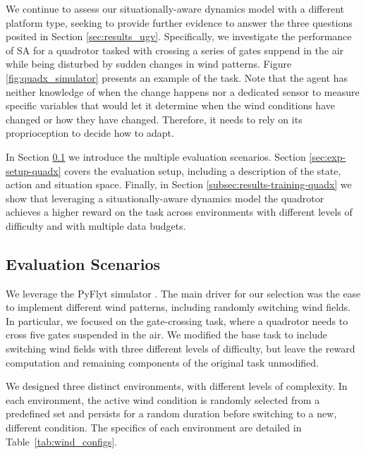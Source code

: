 \documentclass[Afour,sageh,times]{sagej}
\theoremstyle{lemma}
\begin{document}
We continue to assess our situationally-aware dynamics model with a different platform type, seeking to provide further evidence to answer the three questions posited in Section \ref{sec:results_ugv}. Specifically, we investigate the performance of SA for a quadrotor tasked with crossing a series of gates suppend in the air while being disturbed by sudden changes in wind patterns. Figure \ref{fig:quadx_simulator} presents an example of the task. Note that the agent has neither knowledge of when the change happens nor a dedicated sensor to measure specific variables that would let it determine when the wind conditions have changed or how they have changed. Therefore, it needs to rely on its proprioception to decide how to adapt.

In Section \ref{subsec:eval-scenarios-quadx} we introduce the multiple evaluation scenarios. Section \ref{sec:exp-setup-quadx} covers the evaluation setup, including a description of the state, action and situation space. Finally, in Section \ref{subsec:results-training-quadx} we show that leveraging a situationally-aware dynamics model the quadrotor achieves a higher reward on the task across environments with different levels of difficulty and with multiple data budgets.

\subsection{Evaluation Scenarios}  \label{subsec:eval-scenarios-quadx}

We leverage the PyFlyt simulator \cite[]{tai2023pyflyt}. The main driver for our selection was the ease to implement different wind patterns, including randomly switching wind fields. In particular, we focused on the gate-crossing task, where a quadrotor needs to cross five gates suspended in the air. We modified the base task to include switching wind fields with three different levels of difficulty, but leave the reward computation and remaining components of the original task unmodified.

We designed three distinct environments, with different levels of complexity. In each environment, the active wind condition is randomly selected from a predefined set and persists for a random duration before switching to a new, different condition. The specifics of each environment are detailed in Table~\ref{tab:wind_configs}.
\end{document}
